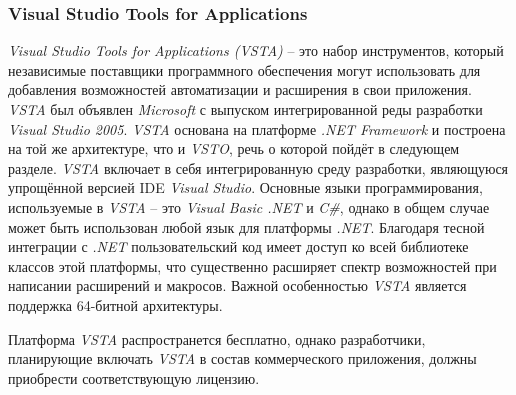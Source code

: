 \subsubsection{Visual Studio Tools for Applications}

{\it Visual Studio Tools for Applications (VSTA)} -- это набор инструментов, который независимые поставщики программного обеспечения могут использовать для добавления возможностей автоматизации и расширения в свои приложения. {\it VSTA} был объявлен {\it Microsoft} с выпуском интегрированной реды разработки {\it Visual Studio 2005}. {\it VSTA} основана на платформе {\it .NET Framework} и построена на той же архитектуре, что и {\it VSTO}, речь о которой пойдёт в следующем разделе. {\it VSTA} включает в себя интегрированную среду разработки, являющуюся упрощённой версией IDE {\it Visual Studio}. Основные языки программирования, используемые в {\it VSTA} -- это {\it Visual Basic .NET} и {\it C\#}, однако в общем случае может быть использован любой язык для платформы {\it .NET}. Благодаря тесной интеграции с {\it .NET} пользовательский код имеет доступ ко всей библиотеке классов этой платформы, что существенно расширяет спектр возможностей при написании расширений и макросов. Важной особенностью {\it VSTA} является поддержка 64-битной архитектуры. 

Платформа {\it VSTA} распространется бесплатно, однако разработчики, планирующие включать {\it VSTA} в состав коммерческого приложения, должны приобрести соответствующую лицензию.